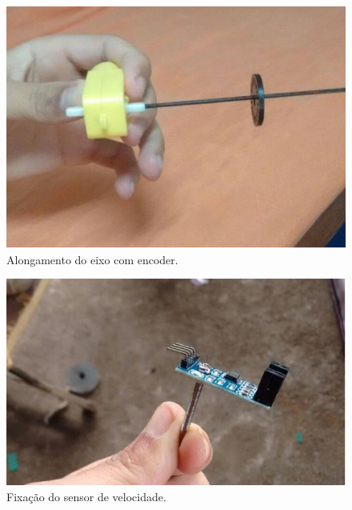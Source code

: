 \begin{itemize}
        \begin{figure}[H]                                                           
            \centering                                                                
            \includegraphics[scale=0.5]{figuras/eixoencoder.png}               
            \caption{Alongamento do eixo com encoder.}    
            \label{img:eixoencoder}                                            
         \end{figure}

         \begin{figure}[H]                                                           
            \centering                                                                
            \includegraphics[scale=0.5]{figuras/fixacaoencoder.png}               
            \caption{Fixação do sensor de velocidade.}    
            \label{img:fixacao_encoder}                                            
         \end{figure}


\end{itemize}
